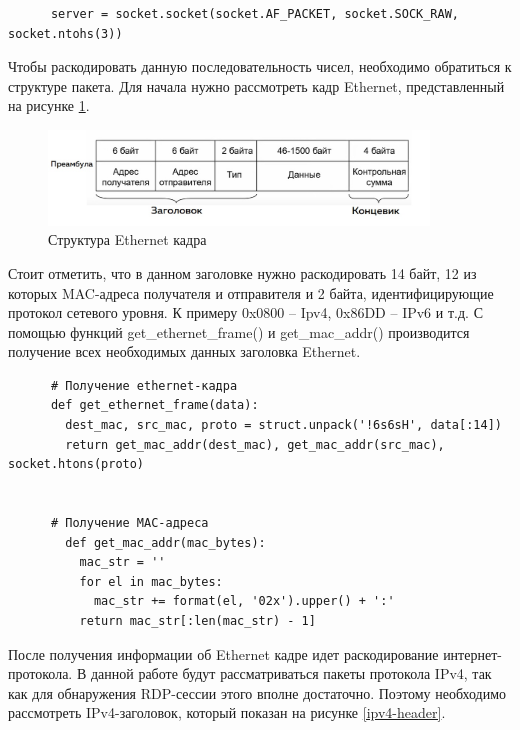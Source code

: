 \documentclass[bachelor, och, coursework]{SCWorks}
\begin{document}
    \begin{verbatim}
      server = socket.socket(socket.AF_PACKET, socket.SOCK_RAW, socket.ntohs(3))
    \end{verbatim}
    
    Чтобы раскодировать данную последовательность чисел, необходимо обратиться к структуре пакета. Для начала нужно рассмотреть кадр Ethernet, представленный
    на рисунке \ref{eth-frame}.
    
    \begin{figure}[H]
      \centering
      \includegraphics[width=0.9\textwidth]{photo/eth-frame.jpg}
      \caption{Структура Ethernet кадра}
      \label{eth-frame}
    \end{figure}
    
    Стоит отметить, что в данном заголовке нужно раскодировать 14 байт, 12 из которых MAC-адреса получателя и отправителя и 2 байта, идентифицирующие протокол
    сетевого уровня. К примеру 0x0800 -- Ipv4, 0x86DD -- IPv6 и т.д. С помощью функций get\_ethernet\_frame() и get\_mac\_addr() производится получение всех необходимых
    данных заголовка Ethernet.
    
    \begin{verbatim}
      # Получение ethernet-кадра
      def get_ethernet_frame(data):
        dest_mac, src_mac, proto = struct.unpack('!6s6sH', data[:14])
        return get_mac_addr(dest_mac), get_mac_addr(src_mac), socket.htons(proto)
      
      
      # Получение MAC-адреса
        def get_mac_addr(mac_bytes):
          mac_str = ''
          for el in mac_bytes:
            mac_str += format(el, '02x').upper() + ':'
          return mac_str[:len(mac_str) - 1]
      \end{verbatim}

    После получения информации об Ethernet кадре идет раскодирование интернет-протокола. В данной работе будут рассматриваться пакеты протокола IPv4, 
    так как для обнаружения RDP-сессии этого вполне достаточно. Поэтому необходимо рассмотреть IPv4-заголовок, который показан на рисунке \ref{ipv4-header}.
\end{document}
